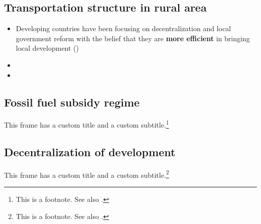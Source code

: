 \documentclass[
10pt,notheorems,compress,hyperref={pdfauthor=Maghfira Ramadhani}
]{beamer}
\begin{document}
\subsection{Transportation structure in rural area}
\begin{frame}
\begin{itemize}
    \item Developing countries have been focusing on decentralization and local government reform with the belief that they are \alert{\textbf{more efficient}} in bringing local development (\citet{vazquez_2017}) 
    \item 
    \item 
\end{itemize}
\end{frame}

\subsection{Fossil fuel subsidy regime}
\begin{frame}
    This frame has a custom title and a custom subtitle.\footnote{This is a footnote. See also \citet{hartojo_2022}. }
\end{frame}

\subsection{Decentralization of development}
\begin{frame}
    This frame has a custom title and a custom subtitle.\footnote{This is a footnote. See also \citep{hartojo_2022}. }
\end{frame}
\end{document}
